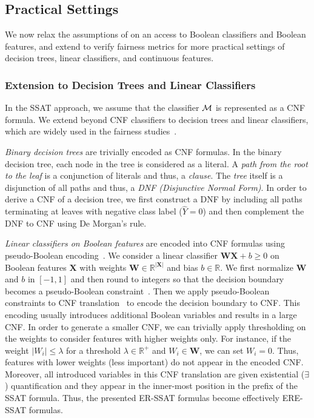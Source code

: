 \subsection{Practical Settings}
\label{sec:practical-setting}
We now relax the assumptions of {\justicia} on an access to Boolean classifiers and Boolean features, and extend {\justicia} to verify fairness metrics for more practical settings of decision trees, linear classifiers, and continuous features.

\subsubsection{Extension to Decision Trees and Linear Classifiers}
In the SSAT approach, we assume that the classifier $\mathcal{M}$ is represented as a CNF formula.  
We extend {\justicia} beyond CNF classifiers to decision trees and linear classifiers, which are widely used in the fairness studies~\cite{zemel2013learning,raff2018fair,zhang2019faht}.

\textit{Binary decision trees} are trivially encoded as  CNF formulas.  In the binary decision tree, each node in the tree is considered as a literal. A \textit{path from the root to the leaf} is a conjunction of literals and thus, a \textit{clause}. The \textit{tree} itself is a disjunction of all paths and thus, a \textit{DNF (Disjunctive Normal Form)}. In order to derive a CNF of a decision tree, we first construct a DNF by including all paths terminating at leaves with negative class label ($ \widehat{Y} = 0 $) and then complement the DNF to CNF using De Morgan's rule. 

\textit{Linear classifiers on Boolean features} are encoded into CNF formulas using pseudo-Boolean encoding~\cite{philipp2015pblib}. We consider a linear classifier  $ \mathbf{W} \mathbf{X} + b \ge 0 $ on Boolean features $ \mathbf{X} $ with weights $ \mathbf{W} \in \mathbb{R}^{|\mathbf{X}|} $ and bias $ b \in \mathbb{R} $.  We first normalize $ \mathbf{W} $ and $ b $ in $ [-1,1] $ and then round to integers so that the decision boundary becomes a pseudo-Boolean constraint~\cite{roussel2009pseudo}.  Then we apply  pseudo-Boolean constraints to CNF translation~\cite{philipp2015pblib} to encode the decision boundary to CNF. This encoding usually introduces additional Boolean variables and results in a large CNF. In order to generate a smaller CNF, we can trivially apply thresholding  on the weights to consider features with higher weights only. For instance, if the weight $  |W_i| \le \lambda $ for a threshold $ \lambda  \in \mathbb{R}^+$ and $ W_i \in \mathbf{W} $, we can set $ W_i = 0 $. Thus, features with lower weights (less important) do not appear in the encoded CNF.  Moreover, all introduced variables in this CNF translation are given existential ($ \exists $) quantification and they appear in the inner-most position in the prefix of the SSAT formula. Thus, the presented ER-SSAT formulas become effectively ERE-SSAT formulas.

